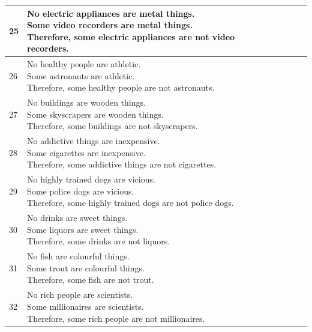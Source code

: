 \documentclass[10pt]{article}
\newcommand{\ptick}{\ding{51}}
\newcommand{\pcross}{\ding{55}}
\begin{document}
\begin{center}
\begin{tabular}{|l|l|c|c|c|c|c|}
			25 &\makecell[l]{No electric appliances are metal things.\\Some video recorders are metal things.\\Therefore, some electric appliances are not video recorders.} & &\ptick & \ptick& & \pcross\\ \hline
			26 &\makecell[l]{No healthy people are athletic.\\Some astronauts are athletic.\\Therefore, some healthy people are not astronauts.} & &\ptick & \ptick& & \pcross\\ \hline
			27 &\makecell[l]{No buildings are wooden things.\\Some skyscrapers are wooden things.\\Therefore, some buildings are not skyscrapers.} & &\ptick & \ptick& & \pcross\\ \hline
			28 &\makecell[l]{No addictive things are inexpensive.\\Some cigarettes are inexpensive.\\Therefore, some addictive things are not cigarettes.}& &\ptick & \ptick& & \pcross\\ \hline
			29 &\makecell[l]{No highly trained dogs are vicious.\\Some police dogs are vicious.\\Therefore, some highly trained dogs are not police dogs.} & &\ptick & \ptick& & \pcross\\ \hline
			30 &\makecell[l]{No drinks are sweet things.\\Some liquors are sweet things.\\Therefore, some drinks are not liquors.} & &\ptick & \ptick& & \pcross\\ \hline
			31 &\makecell[l]{No fish are colourful things.\\ Some trout are colourful things.\\Therefore, some fish are not trout.}& &\ptick & \ptick& & \pcross\\ \hline
			32 &\makecell[l]{No rich people are scientists.\\Some millionaires are scientists.\\Therefore, some rich people are not millionaires.} & &\ptick & \ptick& & \pcross\\ \hline
			

\end{tabular}
\end{center}
\end{document}

